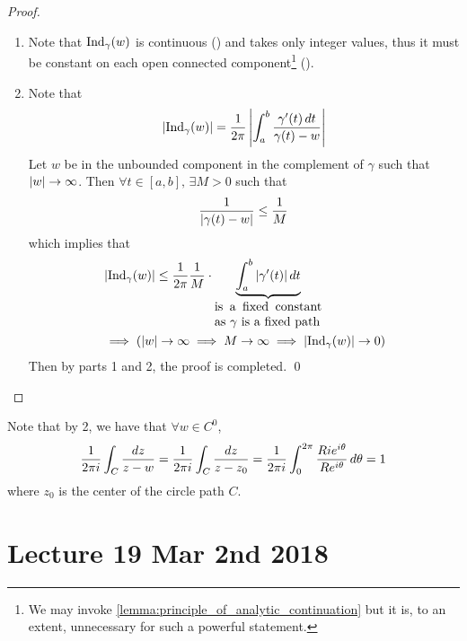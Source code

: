 \documentclass[11pt, oneside]{book}
\begin{document}
\begin{proof}
\begin{enumerate}
		\item Note that $\operatorname{Ind}_{\gamma}(w)$ is continuous () and takes only integer values, thus it must be constant on each open connected component\footnote{We may invoke \cref{lemma:principle_of_analytic_continuation} but it is, to an extent, unnecessary for such a powerful statement.} ().

		\item Note that
		\begin{equation*}
			\left|\operatorname{Ind}_{\gamma}(w)\right| = \frac{1}{2 \pi} \left|\int_{a}^{b} \frac{\gamma'(t) \mathop{}\!d{t}}{\gamma(t) - w}\right|
		\end{equation*}
		Let $w$ be in the unbounded component in the complement of $\gamma$ such that $\left|w\right| \to \infty$. Then $\forall t \in [a, b], \, \exists M > 0$ such that
		\begin{equation*}
			\frac{1}{\left|\gamma(t) - w\right|} \leq \frac{1}{M}
		\end{equation*}
		which implies that
		\begin{align*}
			&\abs{\ind{w}{\gamma}} \leq \frac{1}{2 \pi} \frac{1}{M} \cdot \underbrace{\int_{a}^{b} \abs{\gamma'(t)} \dif{t}}_{\parbox{3cm}{is a fixed constant as $\gamma$ is a fixed path}} \\
			&\implies (\abs{w} \to \infty \implies M \to \infty \implies \abs{\ind{w}{\gamma}} \to 0)
		\end{align*}
		Then by parts 1 and 2, the proof is completed. \qed
	\end{enumerate}
\end{proof}

\begin{remark}
	Note that by 2, we have that $\forall w \in C^0$,
	\begin{equation*}
		\frac{1}{2 \pi i} \int_{C} \frac{\mathop{}\!d{z}}{z - w} = \frac{1}{2 \pi i} \int_{C} \frac{\mathop{}\!d{z}}{z - z_0} = \frac{1}{2 \pi i } \int_{0}^{2 \pi} \frac{Rie^{i \theta}}{Re^{i \theta}} \mathop{}\!d{\theta} = 1  
	\end{equation*}
	where $z_0$ is the center of the circle path $C$.
\end{remark}



\chapter{Lecture 19 Mar 2nd 2018}
	\label{chapter:lecture_19_mar_2nd_2018}
\end{document}
